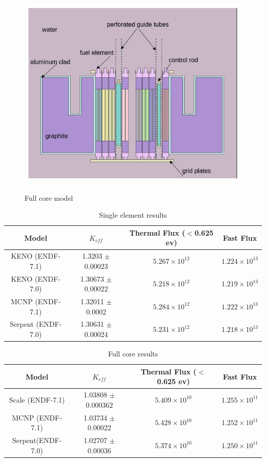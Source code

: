 \documentclass[review]{elsarticle}
\begin{document}
 \begin{figure}[h]
 	\centering
 	\includegraphics[scale=0.7]{full_core.jpg}\\
 	\caption{Full core model}
 	\label{fig:full_core_model}
 \end{figure}
 
 
 \begin{table}[h]
 	\centering
 	\caption{Single element results}
 	\label{single_rsults_keff}
 	\begin{tabular}{c c c c }
 		\hline
 		Model & $K_{eff}$ & Thermal Flux ($<$0.625 ev)& Fast Flux\\
 		\hline
 		KENO (ENDF-7.1)& 1.3203 $\pm$ 0.00023&  $5.267 \times 10^{12}$  & $1.224 \times 10^{13}$ \\
 		KENO (ENDF-7.0) & 1.30673 $\pm$ 0.00022&  $5.218 \times 10^{12}$  & $1.219 \times 10^{13}$ \\
 		MCNP (ENDF-7.1)& 1.32011 $\pm$ 0.0002 &  $5.284 \times 10^{12}$ & $1.222 \times 10^{13}$ \\
 		Serpent (ENDF-7.0) &1.30631 $\pm$ 0.00024&  $5.231 \times 10 ^{12}$  & $1.218 \times 10 ^{13}$\\
 	\end{tabular}
 \end{table}
 
  \begin{table}[h]
  	\caption{Full core results}
  	\label{full_core_results_keff}
  	\begin{tabular}{c c c c }
  		\hline
  		Model & $K_{eff}$ & Thermal Flux ($<$0.625 ev)& Fast Flux \\
  		\hline
  		Scale (ENDF-7.1)& 1.03808 $\pm$  0.000362&  $5.409 \times 10^{10}$ & $1.255\times 10^{11}  $ \\
  		MCNP (ENDF-7.1)& 1.03734   $\pm$ 0.00022 &  $5.428 \times 10^{10}$ & $1.252\times 10^{11}$\\
  		Serpent(ENDF-7.0) & 1.02707  $\pm$  0.00036  & $5.374\times 10^{10}$ & $1.250\times 10^{11}$\\
  	\end{tabular}
  \end{table}
  
\end{document}
